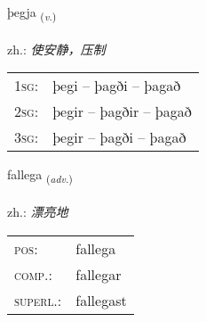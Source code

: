 \documentclass[frontgrid, backgrid]{flacards}\usepackage[]{graphicx}\usepackage[]{xcolor}
\begin{document}
\renewcommand{\flhead}{\vskip5pt \fboxsep=0pt {\small\bfseries\footnotesize Sagnorð | 动词}}
\renewcommand{\fcfoot}{\vskip5pt \fboxsep=0pt \hspace{2pt}{\small\bfseries\footnotesize 3K}}

\renewcommand{\blhead}{\vskip5pt {\small\bfseries\footnotesize Sagnorð | 动词 }}
\renewcommand{\bcfoot}{\vskip5pt \hspace{2pt}{\small\bfseries\footnotesize 3K}}


{þegja \small{\textsubscript{(\textit{v.})}} \\[1ex] %
\textphonetic{[θeija]} \\
zh.: \emph{使安静，压制} \\  [2ex]
\renewcommand*{\arraystretch}{0.8}
\begin{tabular}{p{1cm}l}
\textsc{1sg}: & þegi -- þagði -- þagað \\ 
\textsc{2sg}: & þegir -- þagðir -- þagað \\ 
\textsc{3sg}: & þegir -- þagði -- þagað \\ 
\end{tabular}
}

\renewcommand{\flhead}{\vskip5pt \fboxsep=0pt {\small\bfseries\footnotesize Atviksorð | 副词}}
\renewcommand{\fcfoot}{\vskip5pt \fboxsep=0pt \hspace{2pt}{\small\bfseries\footnotesize 3K}}

\renewcommand{\blhead}{\vskip5pt {\small\bfseries\footnotesize Atviksorð | 副词 }}
\renewcommand{\bcfoot}{\vskip5pt \hspace{2pt}{\small\bfseries\footnotesize 3K}}


{fallega \small{\textsubscript{(\textit{adv.})}} \\[1ex] %
\textphonetic{[fatlɛɣa]} \\
zh.: \emph{漂亮地} \\  [2ex]
\renewcommand*{\arraystretch}{0.8}
\begin{tabular}{ll}
\textsc{pos}: & fallega \\ 
\textsc{comp.}: & fallegar \\ 
\textsc{superl.}: & fallegast \\
\end{tabular}
}
\end{document}
